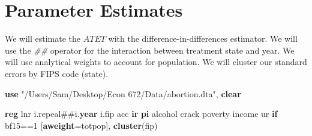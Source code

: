 \documentclass[
]{book}
\newenvironment{Shaded}{\begin{snugshade}}{\end{snugshade}}
\newcommand{\FunctionTok}[1]{\textcolor[rgb]{0.13,0.29,0.53}{\textbf{#1}}}
\newcommand{\KeywordTok}[1]{\textcolor[rgb]{0.13,0.29,0.53}{\textbf{#1}}}
\newcommand{\NormalTok}[1]{#1}
\newcommand{\StringTok}[1]{\textcolor[rgb]{0.31,0.60,0.02}{#1}}
\begin{document}
\section{Parameter Estimates}\label{parameter-estimates}

We will estimate the \(ATET\) with the difference-in-differences estimator. We will use the \emph{\#\#} operator for the interaction between treatment state and year. We will use analytical weights to account for population. We will cluster our standard errors by FIPS code (state).

\begin{Shaded}
\begin{Highlighting}[]
\KeywordTok{use} \StringTok{"/Users/Sam/Desktop/Econ 672/Data/abortion.dta"}\NormalTok{, }\KeywordTok{clear}

\KeywordTok{reg}\NormalTok{ lnr i.repeal\#\#i.}\FunctionTok{year}\NormalTok{ i.fip acc }\KeywordTok{ir} \KeywordTok{pi}\NormalTok{ alcohol crack poverty income ur }\KeywordTok{if}\NormalTok{ bf15==1 [}\KeywordTok{aweight}\NormalTok{=totpop], }\KeywordTok{cluster}\NormalTok{(fip)}
\end{Highlighting}
\end{Shaded}
\end{document}
